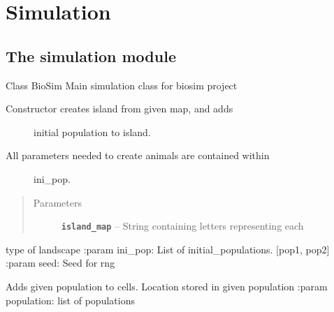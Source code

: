 \documentclass[a4paper,10pt,openany,oneside]{sphinxmanual}
\begin{document}
\chapter{Simulation}
\label{simulation::doc}\label{simulation:simulation}

\section{The simulation module}
\label{simulation:module-biosim.simulation}\label{simulation:the-simulation-module}

\begin{fulllineitems}
\label{simulation:biosim.simulation.BioSim}
Class BioSim
Main simulation class for biosim project
\begin{description}
\item[{Constructor creates island from given map, and adds}] \leavevmode
initial population to island.

\item[{All parameters needed to create animals are contained within}] \leavevmode
ini\_pop.

\end{description}
\begin{quote}\begin{description}
\item[{Parameters}] \leavevmode
\textbf{\texttt{island\_map}} -- String containing letters representing each

\end{description}\end{quote}

type of landscape
:param ini\_pop: List of initial\_populations. {[}pop1, pop2{]}
:param seed: Seed for rng

\begin{fulllineitems}
\label{simulation:biosim.simulation.BioSim.add_population}
Adds given population to cells. Location stored in given population
:param population: list of populations

\end{fulllineitems}



\end{fulllineitems}
\end{document}
